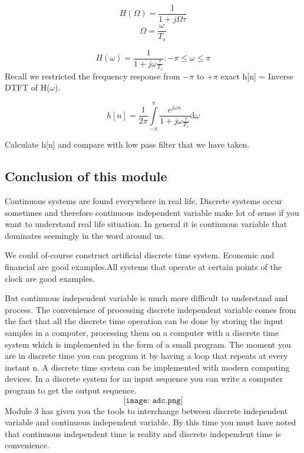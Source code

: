 $$ H(\Omega)= \frac{1}{1+j\Omega \tau}$$
 $$\Omega =\frac{\omega}{T_s}$$

$$H(\omega) = \frac{1}{1+j\omega \frac{\tau}{T_s}} : -\pi \leq \omega \leq \pi$$
Recall we restricted the frequency response from $-\pi$ to $+\pi$
exact h[n] = Inverse DTFT of H($\omega$).


$$h[n]=\frac{1}{2\pi}\int\limits_{-\pi}^{\pi} \frac{e^{j\omega n}}{1+j\omega\frac{\tau}{T_s}} \mbox{d$\omega$}$$

Calculate h[n] and compare with low pass filter that we have taken.

\subsection{Conclusion of this module}

Continuous systems are found everywhere in real life.
Discrete systems occur sometimes and therefore continuous independent variable make lot of sense if you want to understand real life situation. In general it is continuous variable that dominates seemingly in the word around us.

We could of-course construct artificial discrete time system. Economic and financial are good examples.All systems that operate at certain points of the clock are good examples.

But continuous independent variable is much more difficult to understand and process. The convenience of processing discrete independent variable comes from the fact that all the discrete time operation can be done by storing the input samples in a computer, processing them on a computer with a discrete time system which is implemented in the form of a small program.
The moment you are in discrete time you can program it by having a loop that repeats at every instant n. A discrete time system can be implemented with modern computing devices. In a discrete system for an input sequence you can write a computer program to get the output sequence.
$$\texttt{[image: adc.png]}$$
Module 3 has given you the tools to interchange between discrete independent variable and continuous independent variable. By this time you must have noted that continuous independent time is reality and discrete independent time is convenience.

    



